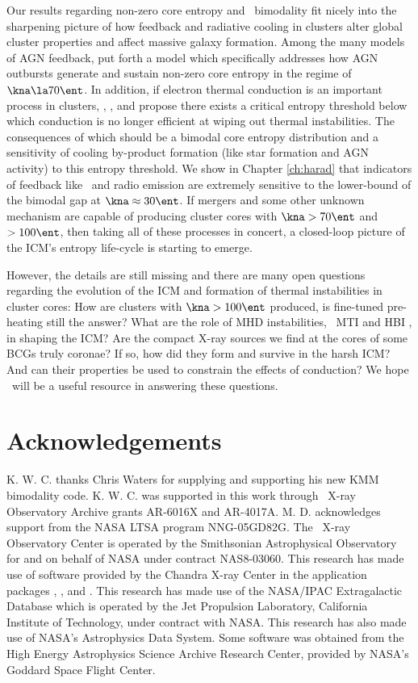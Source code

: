 Our results regarding non-zero core entropy and \kna\ bimodality fit
nicely into the sharpening picture of how feedback and radiative
cooling in clusters alter global cluster properties and affect massive
galaxy formation. Among the many models of AGN feedback,
\citet{agnframework} put forth a model which specifically addresses
how AGN outbursts generate and sustain non-zero core entropy in the
regime of $\kna \la 70 \ent$. In addition, if electron thermal
conduction is an important process in clusters, \citet{radioquiet},
\citet{agnframework}, and \citet{conduction} propose there exists a
critical entropy threshold below which conduction is no longer
efficient at wiping out thermal instabilities. The consequences of
which should be a bimodal core entropy distribution and a sensitivity
of cooling by-product formation (like star formation and AGN activity)
to this entropy threshold. We show in Chapter \ref{ch:harad} that
indicators of feedback like \halpha\ and radio emission are extremely
sensitive to the lower-bound of the bimodal gap at $\kna \approx 30
\ent$. If mergers and some other unknown mechanism are capable of
producing cluster cores with $\kna > 70 \ent$ and $> 100 \ent$, then
taking all of these processes in concert, a closed-loop picture of the
ICM's entropy life-cycle is starting to emerge.

However, the details are still missing and there are many open
questions regarding the evolution of the ICM and formation of thermal
instabilities in cluster cores: How are clusters with $\kna > 100
\ent$ produced, is fine-tuned pre-heating still the answer? What are
the role of MHD instabilities, \eg\ MTI \citep{2000ApJ...534..420B,
2008ApJ...673..758Q} and HBI \citep{2008ApJ...677L...9P}, in shaping
the ICM?  Are the compact X-ray sources we find at the cores of some
BCGs truly coronae? If so, how did they form and survive in the harsh
ICM? And can their properties be used to constrain the effects of
conduction? We hope \accept\ will be a useful resource in answering
these questions.

\section{Acknowledgements}

K. W. C. thanks Chris Waters for supplying and supporting his new KMM
bimodality code. K. W. C. was supported in this work through
\chandra\ X-ray Observatory Archive grants AR-6016X and
AR-4017A. M. D. acknowledges support from the NASA LTSA program
NNG-05GD82G. The \chandra\ X-ray Observatory Center is operated by the
Smithsonian Astrophysical Observatory for and on behalf of NASA under
contract NAS8-03060. This research has made use of software provided
by the Chandra X-ray Center in the application packages \ciao, \chips,
and \sherpa. This research has made use of the NASA/IPAC Extragalactic
Database which is operated by the Jet Propulsion Laboratory,
California Institute of Technology, under contract with NASA. This
research has also made use of NASA's Astrophysics Data System. Some
software was obtained from the High Energy Astrophysics Science
Archive Research Center, provided by NASA's Goddard Space Flight
Center.

